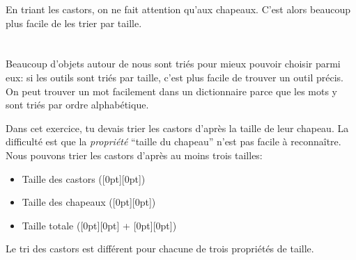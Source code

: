 {{En triant les castors, on ne fait attention qu’aux chapeaux. C’est alors beaucoup plus facile de les trier par taille.

{\centering%
\raisebox{-0.5ex}{}    \raisebox{-0.5ex}{}\par}



\section*{\BrochureItsInformatics}
Beaucoup d’objets autour de nous sont triés pour mieux pouvoir choisir parmi eux: si les outils sont triés par taille, c’est plus facile de trouver un outil précis. On peut trouver un mot facilement dans un dictionnaire parce que les mots y sont triés par ordre alphabétique.

Dans cet exercice, tu devais trier les castors d’après la taille de leur chapeau. La difficulté est que la \emph{propriété} “taille du chapeau” n’est pas facile à reconnaître. Nous pouvons trier les castors d’après au moins trois tailles:

\begin{itemize}
  \item Taille des castors (\raisebox{-0.5ex}[0pt][0pt]{})
  \item Taille des chapeaux (\raisebox{-0.5ex}[0pt][0pt]{})
  \item Taille totale (\raisebox{-0.5ex}[0pt][0pt]{} + \raisebox{-0.5ex}[0pt][0pt]{})
\end{itemize}

{\centering%
\par}

Le tri des castors est différent pour chacune de trois propriétés de taille.

}}

